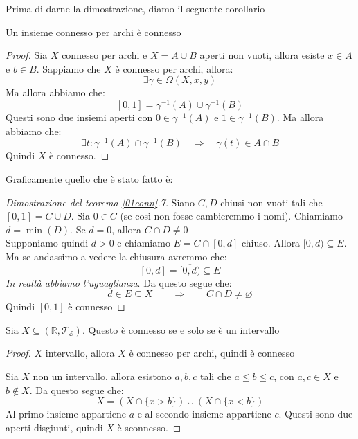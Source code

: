\documentclass[11pt,a4paper,twoside]{article}
\theoremstyle{definition}
\begin{document}
Prima di darne la dimostrazione, diamo il seguente corollario

\begin{cor}{}{}
	Un insieme connesso per archi è connesso
\end{cor}
\begin{proof}
	Sia $X$ connesso per archi e $X = A \cup B$ aperti non vuoti, allora esiste $x \in A$ e $b \in B$.
	Sappiamo che $X$ è connesso per archi, allora:
	\[\exists \gamma \in \Omega(X, x, y)\]
	Ma allora abbiamo che:
	\[ [0,1] = \gamma^{-1}(A) \cup \gamma^{-1}(B) \]
	Questi sono due insiemi aperti con $0 \in \gamma^{-1}(A)$ e $1 \in \gamma^{-1}(B)$. Ma allora abbiamo che:
	\[ \exists t: \gamma^{-1}(A) \cap \gamma^{-1}(B) \quad \Rightarrow \quad \gamma(t) \in A \cap B\]
	Quindi $X$ è connesso.
\end{proof}

Graficamente quello che è stato fatto è:
\begin{center}
\end{center}

\begin{proof}[Dimostrazione del teorema \ref{01conn}.7]
	Siano $C, D$ chiusi non vuoti tali che $[0,1] = C \cup D$. Sia $0 \in C$ (se così non fosse cambieremmo i nomi). Chiamiamo $d = \min(D)$. Se $d = 0$, allora $C \cap D \neq 0$\\
	Supponiamo quindi $d>0$ e chiamiamo $E = C \cap [0,d]$ chiuso. Allora $[0,d)\subseteq E$. Ma se andassimo a vedere la chiusura avremmo che:
	\[ [0,d] = \overline{[0,d)} \subseteq E \]
	\textit{In realtà abbiamo l'uguaglianza}. Da questo segue che:
	\[ d \in E \subseteq X \qquad \Rightarrow \qquad C \cap D \neq \varnothing \]
	Quindi $[0,1]$ è connesso
\end{proof}

\begin{cor}{}{}
	Sia $X \subseteq (\mathbb R, \mathcal T_\mathcal E)$. Questo è connesso se e solo se è un intervallo
\end{cor}
\begin{proof}
	\fbox{$\Leftarrow$} $X$ intervallo, allora $X$ è connesso per archi, quindi è connesso

	\fbox{$\Rightarrow$} Sia $X$ non un intervallo, allora esistono $a,b,c$ tali che $a \leq b \leq c$, con $a,c \in X$ e $b \not \in X$. Da questo segue che:
	\[ X = (X \cap \{x>b\}) \cup (X\cap \{x<b\}) \]
	Al primo insieme appartiene $a$ e al secondo insieme appartiene $c$. Questi sono due aperti disgiunti, quindi $X$ è sconnesso.
\end{proof}
\end{document}
